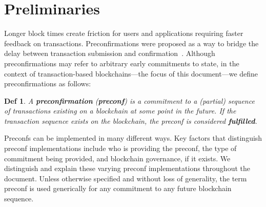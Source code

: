 \documentclass[a4paper]{article}
\theoremstyle{boldstyle}
\newtheorem*{definitionx}{Def}
\newenvironment{definition}
  {\begin{defopenboxq}\begin{definitionx}}
  {\end{definitionx}\end{defopenboxq}}
\begin{document}
\section{Preliminaries}
    Longer block times create friction for users and applications requiring faster feedback on transactions. Preconfirmations were proposed as a way to bridge the delay between transaction submission and confirmation~\cite{W:Basedpreconfirmations}. Although preconfirmations may refer to arbitrary early commitments to state, in the context of transaction-based blockchains—the focus of this document—we define preconfirmations as follows: 
        \begin{definition}
        A \textbf{preconfirmation} (\textbf{preconf}) is a commitment to a (partial) sequence of transactions existing on a blockchain at some point in the future. If the transaction sequence exists on the blockchain, the preconf is considered \textbf{fulfilled}.
        \end{definition}
     Preconfs can be implemented in many different ways. Key factors that distinguish preconf implementations include who is providing the preconf, the type of commitment being provided, and blockchain governance, if it exists. We distinguish and explain these varying preconf implementations throughout the document. Unless otherwise specified and without loss of generality, the term preconf is used generically for any commitment to any future blockchain sequence.
\end{document}
